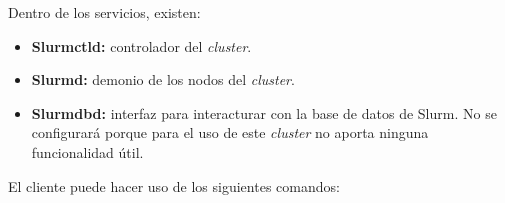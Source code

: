 Dentro de los servicios, existen: 
\vspace{2mm}
\begin{itemize}
    \item \textbf{Slurmctld: } controlador del \emph{cluster}. 
    \item \textbf{Slurmd: } demonio de los nodos del \emph{cluster}.
    \item \textbf{Slurmdbd: } interfaz para interacturar con la base de datos de Slurm. No se configurará porque para el uso de este \emph{cluster} no aporta ninguna funcionalidad útil.
\end{itemize}
\vspace{4mm}

El cliente puede hacer uso de los siguientes comandos:
\vspace{2mm}

